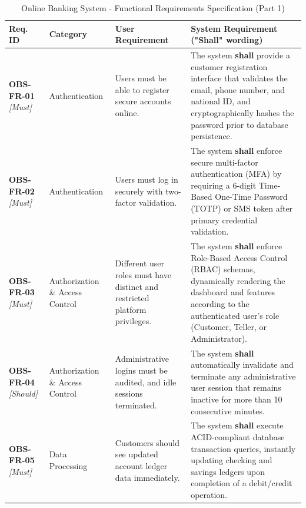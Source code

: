 \documentclass[11pt,a4paper]{article}
\begin{document}
\begin{table}[H]
\centering
\caption{Online Banking System - Functional Requirements Specification (Part 1)}
\label{tab:functional_reqs_1}
\footnotesize
\singlespacing
\begin{tabular}{p{2.0cm} p{2.2cm} p{3.8cm} p{5.4cm}}
\toprule
\textbf{Req. ID} & \textbf{Category} & \textbf{User Requirement} & \textbf{System Requirement ("Shall" wording)} \\ \midrule

\textbf{OBS-FR-01} \newline \textit{\small [Must]} & Authentication & Users must be able to register secure accounts online. & The system \textbf{shall} provide a customer registration interface that validates the email, phone number, and national ID, and cryptographically hashes the password prior to database persistence. \\ \midrule

\textbf{OBS-FR-02} \newline \textit{\small [Must]} & Authentication & Users must log in securely with two-factor validation. & The system \textbf{shall} enforce secure multi-factor authentication (MFA) by requiring a 6-digit Time-Based One-Time Password (TOTP) or SMS token after primary credential validation. \\ \midrule

\textbf{OBS-FR-03} \newline \textit{\small [Must]} & Authorization \& Access Control & Different user roles must have distinct and restricted platform privileges. & The system \textbf{shall} enforce Role-Based Access Control (RBAC) schemas, dynamically rendering the dashboard and features according to the authenticated user's role (Customer, Teller, or Administrator). \\ \midrule

\textbf{OBS-FR-04} \newline \textit{\small [Should]} & Authorization \& Access Control & Administrative logins must be audited, and idle sessions terminated. & The system \textbf{shall} automatically invalidate and terminate any administrative user session that remains inactive for more than 10 consecutive minutes. \\ \midrule

\textbf{OBS-FR-05} \newline \textit{\small [Must]} & Data Processing & Customers should see updated account ledger data immediately. & The system \textbf{shall} execute ACID-compliant database transaction queries, instantly updating checking and savings ledgers upon completion of a debit/credit operation. \\ \midrule


\end{tabular}
\end{table}
\end{document}
